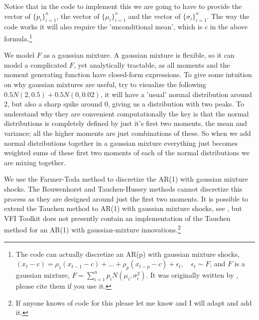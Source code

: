Notice that in the code to implement this we are going to have to provide the vector of $\{p_i\}_{i=1}^n$, the vector of $\{\mu_i\}_{i=1}^n$ and the vector of $\{\sigma_i\}_{i=1}^n$. The way the code works it will also require the 'unconditional mean', which is $c$ in the above formula.\footnote{The code can actually discretize an AR(p) with gaussian mixture shocks, $(x_t-c)=\rho_1 (x_{t-1}-c) + ... +\rho_p (x_{t-p}-c)+  \epsilon_t, \quad \epsilon_t \sim F$, and $F$ is a gaussian mixture, $F= \sum_{i=1}^n p_i N(\mu_i,\sigma_i^2)$. It was originally written by \cite*{FarmerToda2017}, please cite them if you use it.}

We model $F$ as a gaussian mixture. A gaussian mixture is flexible, so it can model a complicated $F$, yet analytically tractable, as all moments and the moment generating function have closed-form expressions. To give some intuition on why gaussian mixtures are useful, try to visualize the following $0.5 N(2,0.5)+0.5 N(0,0.02)$, it will have a 'usual' normal distribution around 2, but also a sharp spike around 0, giving us a distribution with two peaks. To understand why they are convenient computationally the key is that the normal distributions is completely defined by just it's first two moments, the mean and variance; all the higher moments are just combinations of these. So when we add normal distributions together in a gaussian mixture everything just becomes weighted sums of these first two moments of each of the normal distributions we are mixing together.

We use the Farmer-Toda method to discretize the AR(1) with gaussian mixture shocks. The Rouwenhorst and Tauchen-Hussey methods cannot discretize this process as they are designed around just the first two moments. It is possible to extend the Tauchen method to AR(1) with gaussian mixture shocks, see \cite*{CivalesDiezCatalanFazilet2017}, but VFI Toolkit does not presently contain an implementation of the Tauchen method for an AR(1) with gaussian-mixture innovations.\footnote{If anyone knows of code for this please let me know and I will adapt and add it.}

